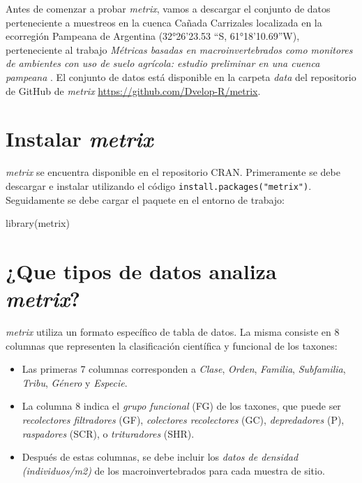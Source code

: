 \documentclass[
]{book}
\newenvironment{Shaded}{\begin{snugshade}}{\end{snugshade}}
\newcommand{\FunctionTok}[1]{\textcolor[rgb]{0.00,0.00,0.00}{#1}}
\newcommand{\NormalTok}[1]{#1}
\begin{document}
Antes de comenzar a probar \emph{metrix}, vamos a descargar el conjunto de datos perteneciente a muestreos en la cuenca Cañada Carrizales localizada en la ecorregión Pampeana de Argentina (32°26'23.53 ``S, 61°18'10.69''W), perteneciente al trabajo \emph{Métricas basadas en macroinvertebrados como monitores de ambientes con uso de suelo agrícola: estudio preliminar en una cuenca pampeana} \citep{capeletti2019}.
El conjunto de datos está disponible en la carpeta \emph{data} del repositorio de GitHub de \emph{metrix} \url{https://github.com/Dvelop-R/metrix}.

\hypertarget{instalar-metrix}{%
\section{\texorpdfstring{Instalar \emph{metrix}}{Instalar metrix}}\label{instalar-metrix}}

\emph{metrix} se encuentra disponible en el repositorio CRAN.
Primeramente se debe descargar e instalar utilizando el código \texttt{install.packages("metrix")}.
Seguidamente se debe cargar el paquete en el entorno de trabajo:

\begin{Shaded}
\begin{Highlighting}[]
\FunctionTok{library}\NormalTok{(metrix)}
\end{Highlighting}
\end{Shaded}

\hypertarget{que-tipos-de-datos-analiza-metrix}{%
\section{\texorpdfstring{¿Que tipos de datos analiza \emph{metrix}?}{¿Que tipos de datos analiza metrix?}}\label{que-tipos-de-datos-analiza-metrix}}

\emph{metrix} utiliza un formato específico de tabla de datos.
La misma consiste en 8 columnas que representen la clasificación científica y funcional de los taxones:

\begin{itemize}
\item
  Las primeras 7 columnas corresponden a \emph{Clase}, \emph{Orden}, \emph{Familia}, \emph{Subfamilia}, \emph{Tribu}, \emph{Género} y \emph{Especie}.
\item
  La columna 8 indica el \emph{grupo funcional} (FG) de los taxones, que puede ser \emph{recolectores filtradores} (GF), \emph{colectores recolectores} (GC), \emph{depredadores} (P), \emph{raspadores} (SCR), o \emph{trituradores} (SHR).
\item
  Después de estas columnas, se debe incluir los \emph{datos de densidad (individuos/m2)} de los macroinvertebrados para cada muestra de sitio.
\end{itemize}
\end{document}
